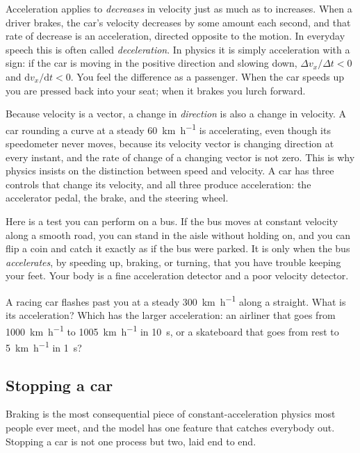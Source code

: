 \documentclass[11pt,twoside,openany]{book}
\newcommand{\dd}{\mathrm{d}}
\newcounter{check}[chapter]
\begin{document}
Acceleration applies to \emph{decreases} in velocity just as much as to increases. When a driver brakes, the car's velocity decreases by some amount each second, and that rate of decrease is an acceleration, directed opposite to the motion. In everyday speech this is often called \emph{deceleration}. In physics it is simply acceleration with a sign: if the car is moving in the positive direction and slowing down, $\Delta v_x/\Delta t < 0$ and $\dd v_x/\dd t < 0$. You feel the difference as a passenger. When the car speeds up you are pressed back into your seat; when it brakes you lurch forward.

Because velocity is a vector, a change in \emph{direction} is also a change in velocity. A car rounding a curve at a steady \SI{60}{\kilo\metre\per\hour} is accelerating, even though its speedometer never moves, because its velocity vector is changing direction at every instant, and the rate of change of a changing vector is not zero. This is why physics insists on the distinction between speed and velocity. A car has three controls that change its velocity, and all three produce acceleration: the accelerator pedal, the brake, and the steering wheel.

Here is a test you can perform on a bus. If the bus moves at constant velocity along a smooth road, you can stand in the aisle without holding on, and you can flip a coin and catch it exactly as if the bus were parked. It is only when the bus \emph{accelerates}, by speeding up, braking, or turning, that you have trouble keeping your feet. Your body is a fine acceleration detector and a poor velocity detector.

\begin{checkbox}
A racing car flashes past you at a steady \SI{300}{\kilo\metre\per\hour} along a straight. What is its acceleration? Which has the larger acceleration: an airliner that goes from \SI{1000}{\kilo\metre\per\hour} to \SI{1005}{\kilo\metre\per\hour} in \SI{10}{\second}, or a skateboard that goes from rest to \SI{5}{\kilo\metre\per\hour} in \SI{1}{\second}?
\end{checkbox}

\subsection{Stopping a car}
\label{sec:stopping}

Braking is the most consequential piece of constant-acceleration physics most people ever meet, and the model has one feature that catches everybody out. Stopping a car is not one process but two, laid end to end.
\end{document}
